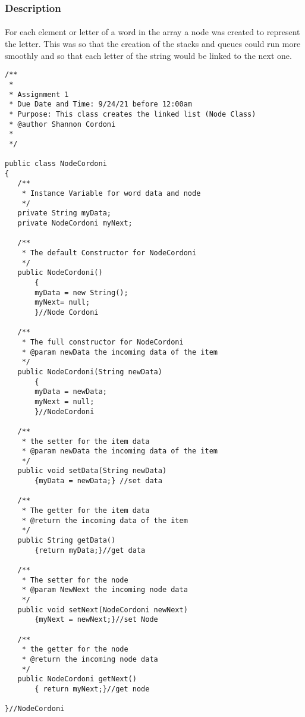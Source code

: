 \documentclass[letterpaper, 10pt,DIV=13]{scrartcl}
\numberwithin{equation}{section} %
\numberwithin{figure}{section} %
\numberwithin{table}{section} %
\begin{document}
\subsubsection{Description}
\paragraph{} For each element or letter of a word in the array a node was created to represent the letter. This was so that the creation of the stacks and queues could run more smoothly and so that each letter of the string would be linked to the next one.

\lstset{numbers=left, numberstyle=\tiny, stepnumber=1, numbersep=5pt, basicstyle=\footnotesize\ttfamily}
\begin{lstlisting}[frame=single, ]
/** 
 * 
 * Assignment 1 
 * Due Date and Time: 9/24/21 before 12:00am 
 * Purpose: This class creates the linked list (Node Class)
 * @author Shannon Cordoni 
 * 
 */

public class NodeCordoni 
{
   /**
    * Instance Variable for word data and node 
    */
   private String myData;
   private NodeCordoni myNext;
   
   /**
    * The default Constructor for NodeCordoni
    */
   public NodeCordoni()
       {
       myData = new String();
       myNext= null;
       }//Node Cordoni
   
   /**
    * The full constructor for NodeCordoni
    * @param newData the incoming data of the item
    */
   public NodeCordoni(String newData)
       {
       myData = newData;
       myNext = null;
       }//NodeCordoni
   
   /**
    * the setter for the item data
    * @param newData the incoming data of the item
    */
   public void setData(String newData)
       {myData = newData;} //set data
   
   /**
    * The getter for the item data
    * @return the incoming data of the item
    */
   public String getData()
       {return myData;}//get data
   
   /**
    * The setter for the node
    * @param NewNext the incoming node data
    */
   public void setNext(NodeCordoni newNext)
       {myNext = newNext;}//set Node
   
   /**
    * the getter for the node
    * @return the incoming node data
    */
   public NodeCordoni getNext()
       { return myNext;}//get node

}//NodeCordoni
\end{lstlisting}
\end{document}
